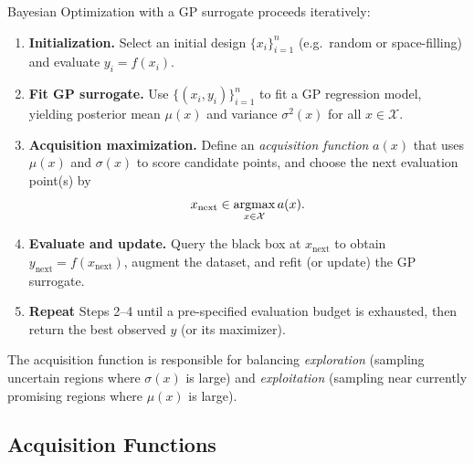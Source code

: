 \documentclass[../main]{subfiles}
\begin{document}
\begin{remark}
        Bayesian Optimization with a GP surrogate proceeds iteratively:
    \begin{enumerate}
        \item \textbf{Initialization.}  Select an initial design
        $\{x_i\}_{i=1}^n$ (e.g.\ random or space-filling) and evaluate
        $y_i = f(x_i)$.
        \item \textbf{Fit GP surrogate.}  Use $\{(x_i,y_i)\}_{i=1}^n$ to fit a GP
        regression model, yielding posterior mean $\mu(x)$ and variance
        $\sigma^2(x)$ for all $x\in\mathcal{X}$.
        \item \textbf{Acquisition maximization.}  Define an \emph{acquisition
        function} $a(x)$ that uses $\mu(x)$ and $\sigma(x)$ to score candidate
        points, and choose the next evaluation point(s) by
        \begin{equation}
            x_{\text{next}} \in \mathop{\mathrm{argmax}}_{x\in\mathcal{X}} a(x).
        \end{equation}
        \item \textbf{Evaluate and update.}  Query the black box at
        $x_{\text{next}}$ to obtain $y_{\text{next}} = f(x_{\text{next}})$, augment
        the dataset, and refit (or update) the GP surrogate.
        \item \textbf{Repeat} Steps 2--4 until a pre-specified evaluation budget is
        exhausted, then return the best observed $y$ (or its maximizer).
    \end{enumerate}
    The acquisition function is responsible for balancing
    \emph{exploration} (sampling uncertain regions where $\sigma(x)$ is large) and
    \emph{exploitation} (sampling near currently promising regions where
    $\mu(x)$ is large).
\end{remark}

\subsection*{Acquisition Functions}
\end{document}
